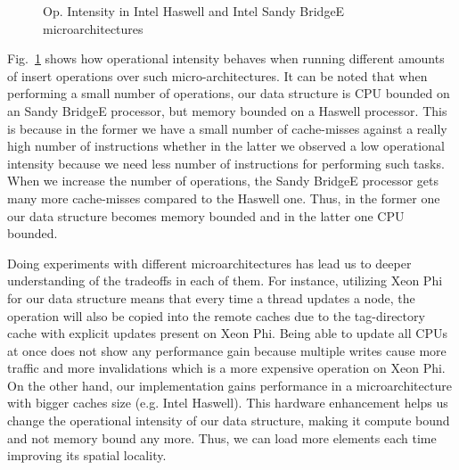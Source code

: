 \begin{figure}[t]
	\centering
	
	\caption{Op. Intensity in Intel Haswell and Intel Sandy BridgeE microarchitectures}
	\label{fig:haswell_ivybridge}
\end{figure}

Fig.~\ref{fig:haswell_ivybridge} shows how operational intensity behaves when running different amounts of insert operations over such micro-architectures. It can be noted that when performing a small number of operations, our data structure is CPU bounded on an Sandy BridgeE processor, but memory bounded on a Haswell processor. This is because in the former we have a small number of cache-misses against a really high number of instructions whether in the latter we observed a low operational intensity because we need less number of instructions for performing such tasks. When we increase the number of operations, the Sandy BridgeE processor gets many more cache-misses compared to the Haswell one. Thus, in the former one our data structure becomes memory bounded and in the latter one CPU bounded.

Doing experiments with different microarchitectures has lead us to deeper understanding of the tradeoffs in each of them. For instance, utilizing Xeon Phi for our data structure means that every time a thread updates a node, the operation will also be copied into the remote caches due to the tag-directory cache with explicit updates present on Xeon Phi. Being able to update all CPUs at once does not show any performance gain because multiple writes cause more traffic and more invalidations which is a more expensive operation on Xeon Phi. On the other hand, our implementation gains performance in a microarchitecture with bigger caches size (e.g. Intel Haswell). This hardware enhancement helps us change the operational intensity of our data structure, making it compute bound and not memory bound any more. Thus, we can load more elements each time improving its spatial locality.
